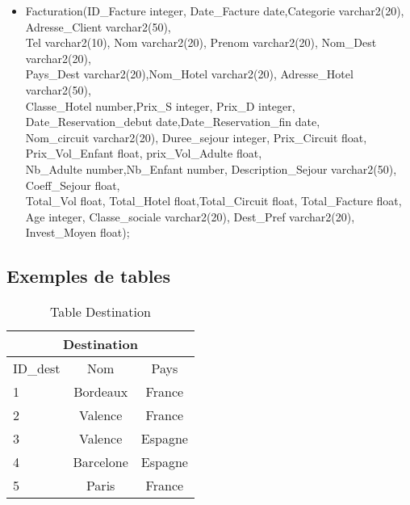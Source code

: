 \begin{itemize}
\item Facturation(ID\_Facture integer, Date\_Facture date,Categorie varchar2(20), Adresse\_Client varchar2(50),\\
	 Tel varchar2(10), Nom varchar2(20), Prenom varchar2(20), Nom\_Dest varchar2(20), \\
	 Pays\_Dest varchar2(20),Nom\_Hotel varchar2(20), Adresse\_Hotel varchar2(50),\\
	 Classe\_Hotel number,Prix\_S integer, Prix\_D integer,\\
	 Date\_Reservation\_debut date,Date\_Reservation\_fin date, \\
	 Nom\_circuit varchar2(20), Duree\_sejour integer, Prix\_Circuit float, \\
	 Prix\_Vol\_Enfant float, prix\_Vol\_Adulte float,\\
	 Nb\_Adulte number,Nb\_Enfant number, Description\_Sejour varchar2(50), Coeff\_Sejour float, \\
	 Total\_Vol float, Total\_Hotel float,Total\_Circuit float, Total\_Facture float, \\
	 Age integer, Classe\_sociale varchar2(20), Dest\_Pref varchar2(20), Invest\_Moyen float);\\
\end{itemize}
\newpage

\subsection{Exemples de tables}


\begin{table}[h]
\begin{center}
\begin{tabular}{|l|c|c|}
\hline
\multicolumn{3}{|c|}{Destination}\\
\hline
ID\_dest& Nom & Pays \\
\hline
1 & Bordeaux& France\\
\hline
2 & Valence& France\\
\hline
3 & Valence& Espagne\\
\hline
4 & Barcelone& Espagne\\
\hline
5 & Paris& France\\
\hline
\end{tabular}
\end{center}
\caption{Table Destination}
\end{table}


